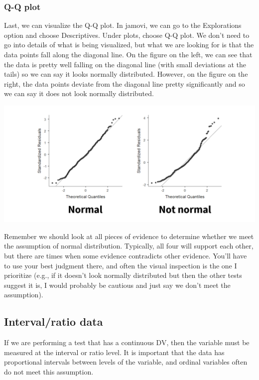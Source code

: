\documentclass[
]{book}
\begin{document}
\hypertarget{q-q-plot}{%
\subsubsection{Q-Q plot}\label{q-q-plot}}

Last, we can visualize the Q-Q plot. In jamovi, we can go to the Explorations option and choose Descriptives. Under plots, choose Q-Q plot. We don't need to go into details of what is being visualized, but what we are looking for is that the data points fall along the diagonal line. On the figure on the left, we can see that the data is pretty well falling on the diagonal line (with small deviations at the tails) so we can say it looks normally distributed. However, on the figure on the right, the data points deviate from the diagonal line pretty significantly and so we can say it does not look normally distributed.

\includegraphics{images/06-inferential/qqplot.png}

Remember we should look at all pieces of evidence to determine whether we meet the assumption of normal distribution. Typically, all four will support each other, but there are times when some evidence contradicts other evidence. You'll have to use your best judgment there, and often the visual inspection is the one I prioritize (e.g., if it doesn't look normally distributed but then the other tests suggest it is, I would probably be cautious and just say we don't meet the assumption).

\hypertarget{intervalratio-data}{%
\subsection{Interval/ratio data}\label{intervalratio-data}}

If we are performing a test that has a continuous DV, then the variable must be measured at the interval or ratio level. It is important that the data has proportional intervals between levels of the variable, and ordinal variables often do not meet this assumption.
\end{document}
